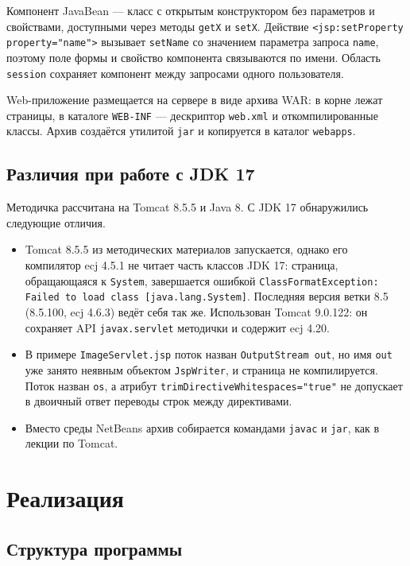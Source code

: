 \documentclass[14pt,a4paper]{extarticle}
\begin{document}
Компонент JavaBean --- класс с открытым конструктором без параметров и свойствами,
доступными через методы \texttt{getX} и \texttt{setX}. Действие
\texttt{<jsp:setProperty property="name">} вызывает \texttt{setName} со значением
параметра запроса \texttt{name}, поэтому поле формы и свойство компонента связываются
по имени. Область \texttt{session} сохраняет компонент между запросами одного
пользователя.

Web-приложение размещается на сервере в виде архива WAR: в корне лежат страницы, в
каталоге \texttt{WEB-INF} --- дескриптор \texttt{web.xml} и откомпилированные классы.
Архив создаётся утилитой \texttt{jar} и копируется в каталог \texttt{webapps}.

\subsection{Различия при работе с JDK 17}

Методичка рассчитана на Tomcat 8.5.5 и Java 8. С JDK 17 обнаружились следующие
отличия.

\begin{itemize}
\item Tomcat 8.5.5 из методических материалов запускается, однако его компилятор
ecj 4.5.1 не читает часть классов JDK 17: страница, обращающаяся к
\texttt{System}, завершается ошибкой \texttt{ClassFormatException: Failed to load
class [java.lang.System]}. Последняя версия ветки 8.5 (8.5.100, ecj 4.6.3) ведёт себя
так же. Использован Tomcat 9.0.122: он сохраняет API \texttt{javax.servlet} методички и
содержит ecj 4.20.
\item В примере \texttt{ImageServlet.jsp} поток назван \texttt{OutputStream out}, но имя
\texttt{out} уже занято неявным объектом \texttt{JspWriter}, и страница не
компилируется. Поток назван \texttt{os}, а атрибут
\texttt{trimDirectiveWhitespaces="true"} не допускает в двоичный ответ переводы строк
между директивами.
\item Вместо среды NetBeans архив собирается командами \texttt{javac} и \texttt{jar},
как в лекции по Tomcat.
\end{itemize}

\section{Реализация}

\subsection{Структура программы}
\end{document}

